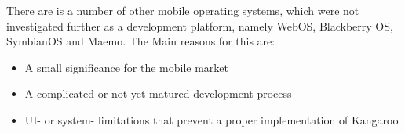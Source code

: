 There are is a number of other mobile operating systems, which were not
investigated further as a development platform, namely WebOS, Blackberry OS, SymbianOS and Maemo.
The Main reasons for this are:
\begin{itemize}
  \item A small significance for the mobile market
  \item A complicated or not yet matured development process
  \item UI- or system- limitations that prevent a proper implementation of Kangaroo
\end{itemize}

